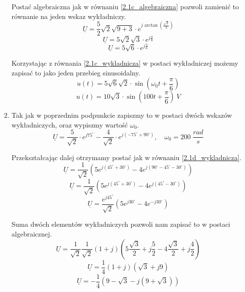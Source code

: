 \documentclass[12pt, a4paper]{article}
\begin{document}
\begin{enumerate}[label=\alph*)]
        Postać algebraiczna jak w równaniu \ref{2.1c_algebraiczna} pozwoli zamienić
        to równanie na jeden wskaz wykładniczy.
        $$
          \underline{U} = \dfrac{5}{2}\sqrt{2}\sqrt{9+3}\cdot e^{j\arctan\left(
              \frac{\sqrt{3}}{3}\right)}
        $$
        $$
          \underline{U} = 5\sqrt{2}\sqrt{3}\cdot e^{j\frac{\pi}{6}}
        $$
        \begin{equation}\label{2.1c_wykladnicza}
          \underline{U} = 5\sqrt{6}\cdot e^{j\frac{\pi}{6}}
        \end{equation}

        Korzystając z równania \ref{2.1c_wykladnicza} w postaci wykładniczej
        możemy zapisać to jako jeden przebieg sinusoidalny.
        $$
          u(t) = 5\sqrt{6}\sqrt{2}\cdot\sin\left(\omega_0 t+\dfrac{\pi}{6}\right)
        $$
        $$
          u(t) = 10\sqrt{3}\cdot\sin\left(100 t+\dfrac{\pi}{6}\right)\: V
        $$
  \item Tak jak w poprzednim podpunkcie zapiszmy to w postaci dwóch wskazów
        wykładniczych, oraz wypiszmy wartość $\omega_0$.
        $$
          \underline{U} = \frac{5}{\sqrt{2}}\cdot e^{j75^\circ}-\frac{4}{\sqrt{2}}
          \cdot e^{j(-75^\circ+90^\circ)}, \quad \omega_0 = 200\; \frac{rad}{s}
        $$

        Przekształcając dalej otrzymamy postać jak w równaniu \ref{2.1d_wykladnicza}.
        $$
          \underline{U} = \frac{1}{\sqrt{2}}\left(5e^{j(45^\circ+30^\circ)}
          -4e^{j(90^\circ-45^\circ-30^\circ)} \right)
        $$
        $$
          \underline{U} = \frac{1}{\sqrt{2}}\left(5e^{j(45^\circ+30^\circ)}
          -4e^{j(45^\circ-30^\circ)} \right)
        $$
        \begin{equation}\label{2.1d_wykladnicza}
          \underline{U} = \frac{e^{j45^\circ}}{\sqrt{2}}
          \left(5e^{j30^\circ}-4e^{-j30^\circ} \right)
        \end{equation}

        Suma dwóch elementów wykładniczych pozwoli nam zapisać to w postaci
        algebraicznej.
        $$
          \underline{U} = \frac{1}{\sqrt{2}}\frac{1}{\sqrt{2}}(1+j)
          \left(5\frac{\sqrt{3}}{2}+j\frac{5}{2}-4\frac{\sqrt{3}}{2}+j\frac{4}{2}\right)
        $$
        $$
          \underline{U} = \frac{1}{4}(1+j)\left(\sqrt{3}+j9\right)
        $$
        \begin{equation}\label{2.1d_algebraiczna}
          \underline{U} = -\frac{1}{4}\left(9-\sqrt{3}-j\left(9+\sqrt{3}\right)\right)
        \end{equation}


\end{enumerate}
\end{document}
